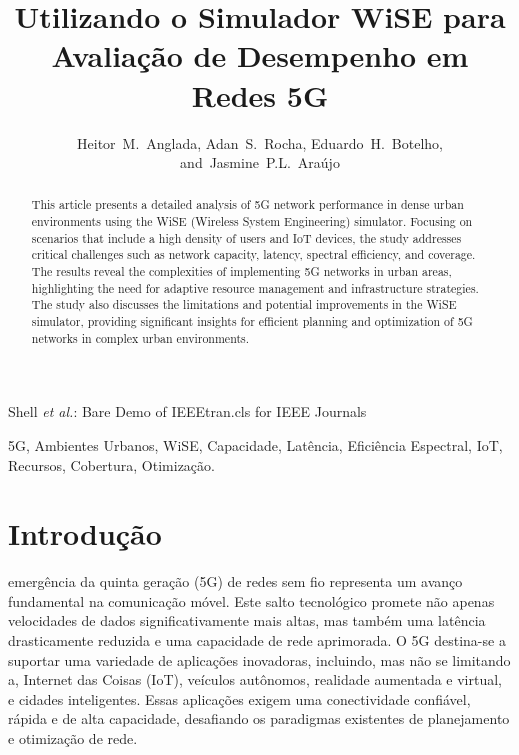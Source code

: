 \documentclass[journal]{IEEEtran}
\begin{document}
\title{Utilizando o Simulador WiSE para Avaliação de Desempenho em Redes 5G}


\author{Heitor~M.~Anglada, Adan~S.~Rocha, Eduardo~H.~Botelho, and~Jasmine~P.L.~Araújo}



%
{Shell \MakeLowercase{\textit{et al.}}: Bare Demo of IEEEtran.cls for IEEE Journals}

\maketitle

\begin{abstract}
  This article presents a detailed analysis of 5G network performance in dense urban environments using the WiSE (Wireless System Engineering) simulator. Focusing on scenarios that include a high density of users and IoT devices, the study addresses critical challenges such as network capacity, latency, spectral efficiency, and coverage. The results reveal the complexities of implementing 5G networks in urban areas, highlighting the need for adaptive resource management and infrastructure strategies. The study also discusses the limitations and potential improvements in the WiSE simulator, providing significant insights for efficient planning and optimization of 5G networks in complex urban environments.

\end{abstract}

\begin{IEEEkeywords}
  5G, 
  Ambientes Urbanos,
  WiSE,
  Capacidade,
  Latência,
  Eficiência Espectral,
  IoT,
  Recursos,
  Cobertura,
  Otimização.
\end{IEEEkeywords}

\IEEEpeerreviewmaketitle



\section{Introdução}
 emergência da quinta geração (5G) de redes sem fio representa um avanço fundamental na comunicação móvel. Este salto tecnológico promete não apenas velocidades de dados significativamente mais altas, mas também uma latência drasticamente reduzida e uma capacidade de rede aprimorada. O 5G destina-se a suportar uma variedade de aplicações inovadoras, incluindo, mas não se limitando a, Internet das Coisas (IoT), veículos autônomos, realidade aumentada e virtual, e cidades inteligentes. Essas aplicações exigem uma conectividade confiável, rápida e de alta capacidade, desafiando os paradigmas existentes de planejamento e otimização de rede.
\end{document}
